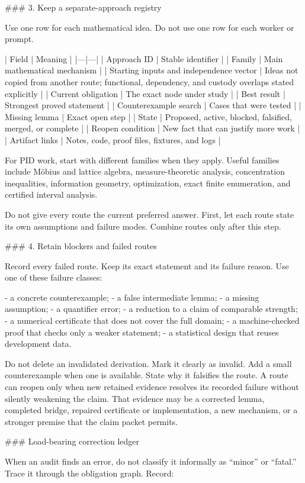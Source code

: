\documentclass[11pt]{article}
\begin{document}
\begin{markdown}
### 3. Keep a separate-approach registry

Use one row for each mathematical idea. Do not use one row for each worker or prompt.

| Field | Meaning |
|---|---|
| Approach ID | Stable identifier |
| Family | Main mathematical mechanism |
| Starting inputs and independence vector | Ideas not copied from another route; functional, dependency, and custody overlaps stated explicitly |
| Current obligation | The exact node under study |
| Best result | Strongest proved statement |
| Counterexample search | Cases that were tested |
| Missing lemma | Exact open step |
| State | Proposed, active, blocked, falsified, merged, or complete |
| Reopen condition | New fact that can justify more work |
| Artifact links | Notes, code, proof files, fixtures, and logs |

For PID work, start with different families when they apply. Useful families include Möbius and
lattice algebra, measure-theoretic analysis, concentration inequalities, information geometry,
optimization, exact finite enumeration, and certified interval analysis.

Do not give every route the current preferred answer. First, let each route state its own
assumptions and failure modes. Combine routes only after this step.

### 4. Retain blockers and failed routes

Record every failed route. Keep its exact statement and its failure reason. Use one of these failure
classes:

- a concrete counterexample;
- a false intermediate lemma;
- a missing assumption;
- a quantifier error;
- a reduction to a claim of comparable strength;
- a numerical certificate that does not cover the full domain;
- a machine-checked proof that checks only a weaker statement;
- a statistical design that reuses development data.

Do not delete an invalidated derivation. Mark it clearly as invalid. Add a small counterexample when
one is available. State why it falsifies the route. A route can reopen only when new retained
evidence resolves its recorded failure without silently weakening the claim. That evidence may be
a corrected lemma, completed bridge, repaired certificate or implementation, a new mechanism, or a
stronger premise that the claim packet permits.

### Load-bearing correction ledger

When an audit finds an error, do not classify it informally as “minor” or “fatal.” Trace it through
the obligation graph. Record:


\end{markdown}
\end{document}
